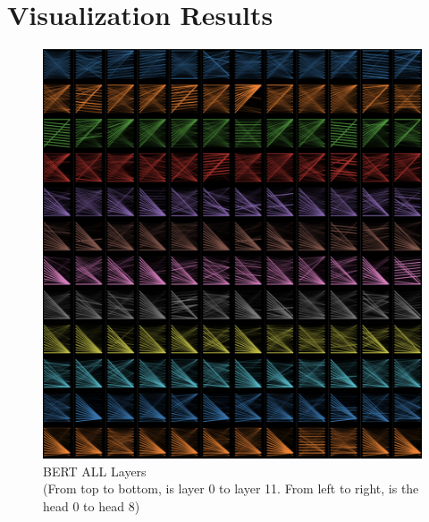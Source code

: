 \documentclass[fyp]{socreport}
\begin{document}






\appendix
\chapter{Visualization Results}

\begin{figure}[h]
    \centering
    \includegraphics[width=\linewidth]{./image/bert_all.png}
    \caption{BERT ALL Layers\\
    (From top to bottom, is layer 0 to layer 11. From left to right, is the head 0 to head 8)}
  \label{bert_all}
\end{figure}
\end{document}
